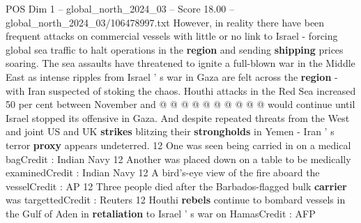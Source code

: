 \begin{textsample}{POS Dim 1 – global\_north\_2024\_03 – Score 18.00 – global\_north\_2024\_03/106478997.txt}
However, in reality there have been frequent attacks on commercial vessels with little or no link to Israel - forcing global sea traffic to halt operations in the \textbf{region} and sending \textbf{shipping} prices soaring.
The sea assaults have threatened to ignite a full-blown war in the Middle East as intense ripples from Israel ' s war in Gaza are felt across the \textbf{region} - with Iran suspected of stoking the chaos.
Houthi attacks in the Red Sea increased 50 per cent between November and @ @ @ @ @ @ @ @ @ @ would continue until Israel stopped its offensive in Gaza.
And despite repeated threats from the West and joint US and UK \textbf{strikes} blitzing their \textbf{strongholds} in Yemen - Iran ' s terror \textbf{proxy} appears undeterred. 12 One was seen being carried in on a medical bagCredit : Indian Navy 12 Another was placed down on a table to be medically examinedCredit : Indian Navy 12 A bird's-eye view of the fire aboard the vesselCredit : AP 12 Three people died after the Barbados-flagged bulk \textbf{carrier} was targettedCredit : Reuters 12 Houthi \textbf{rebels} continue to bombard vessels in the Gulf of Aden in \textbf{retaliation} to Israel ' s war on HamasCredit : AFP

\end{textsample}
